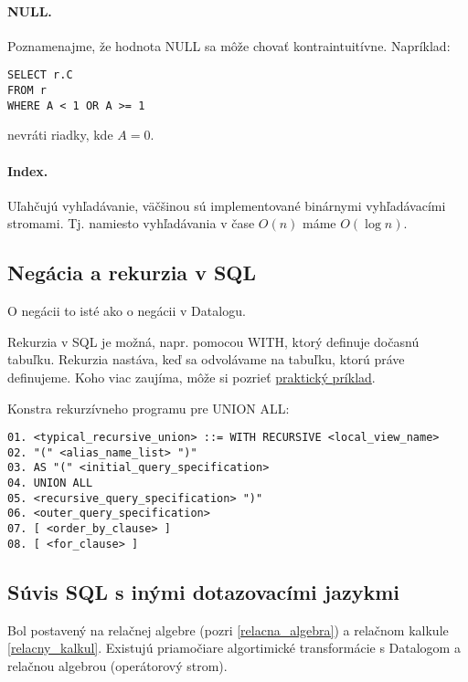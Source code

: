 \documentclass[10pt,a4paper]{article}
\begin{document}
\paragraph{NULL.}
Poznamenajme, že hodnota NULL sa môže chovať kontraintuitívne. 
Napríklad: 
\begin{verbatim}
SELECT r.C
FROM r
WHERE A < 1 OR A >= 1
\end{verbatim} 
nevráti riadky, kde $A=0$. 

\paragraph{Index.}
Uľahčujú vyhľadávanie, väčšinou sú implementované binárnymi vyhľadávacími stromami.
Tj. namiesto vyhľadávania v čase $O(n)$ máme $O(\log n)$.

\subsection{Negácia a rekurzia v SQL}

O negácii to isté ako o negácii v Datalogu. 

Rekurzia v SQL je možná, napr. pomocou WITH, ktorý definuje dočasnú tabuľku. Rekurzia nastáva, keď sa odvolávame na tabuľku, ktorú práve definujeme. Koho viac zaujíma, môže si pozrieť \href{http://sqlanywhere.blogspot.sk/2012/04/example-recursive-union.html}{praktický príklad}. 

Konstra rekurzívneho programu pre UNION ALL: 
\begin{verbatim}
01. <typical_recursive_union> ::= WITH RECURSIVE <local_view_name>
02. "(" <alias_name_list> ")"
03. AS "(" <initial_query_specification>
04. UNION ALL
05. <recursive_query_specification> ")"
06. <outer_query_specification>
07. [ <order_by_clause> ]
08. [ <for_clause> ]
\end{verbatim} 

\subsection{Súvis SQL s inými dotazovacími jazykmi}

Bol postavený na relačnej algebre (pozri \ref{relacna_algebra}) a relačnom kalkule \ref{relacny_kalkul}. Existujú priamočiare algortimické transformácie s Datalogom a relačnou algebrou (operátorový strom). 
 
\end{document}
